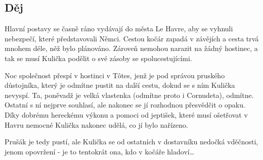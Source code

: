 \subsection*{Děj}
Hlavní postavy se časně ráno vydávají do města Le Havre, aby se vyhnuli nebezpečí, které představovali Němci.
Cestou kočár zapadá v závějích a cesta trvá mnohem déle, něž bylo plánováno.
Zároveň nemohou narazit na žádný hostinec, a tak se musí Kulička podělit o své zásoby se spolucestujícími.

Noc společnost přespí v hostinci v Tôtes, jenž je pod správou pruského důstojníka, který je odmítne pustit na další cestu, dokud se s ním Kulička nevyspí.
Ta, poněvadž je velká vlastenka (odmítne proto i Cornudeta), odmítne.
Ostatní s ní nejprve souhlasí, ale nakonec se jí rozhodnou přesvědčit o opaku.
Díky dobrému hereckému výkonu a pomoci od jeptišek, které musí ošetřovat v Havru nemocné Kulička nakonec udělá, co jí bylo nařízeno.

Prušák je tedy pustí, ale Kulička se od ostatních v dostavníku nedočká vděčnosti, jenom opovržení - je to tentokrát ona, kdo v kočáře hladoví…

